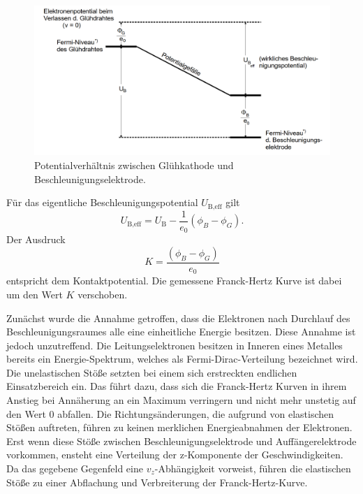 \begin{figure}[H]
	\centering
	\includegraphics[width=1.0\linewidth]{content/grafik/potential.png}
	\captionsetup{width=0.95\linewidth}
	\caption{Potentialverhältnis zwischen Glühkathode und Beschleunigungselektrode. \cite{franck}}
	\label{fig:potential}
\end{figure}

Für das eigentliche Beschleunigungspotential $U_{\text{B}, \text{eff}}$ gilt 
\begin{equation}
    U_{\text{B}, \text{eff}}=U_{\text{B}}-\frac{1}{e_0}\left(\phi_B-\phi_G\right).
    \label{eqn:potential}
\end{equation}
Der Ausdruck 
\begin{equation}
    K = \frac{\left( \phi_B - \phi_G \right)}{e_0} 
    \label{eq:Kontaktpotential} 
\end{equation}
entspricht dem Kontaktpotential. Die gemessene Franck-Hertz Kurve ist dabei um den Wert $K$ verschoben.

Zunächst wurde die Annahme getroffen, dass die Elektronen nach Durchlauf des Beschleunigungsraumes alle eine einheitliche 
Energie besitzen. Diese Annahme ist jedoch unzutreffend. Die Leitungselektronen besitzen in Inneren eines Metalles bereits 
ein Energie-Spektrum, welches als Fermi-Dirac-Verteilung bezeichnet wird.
Die unelastischen Stöße setzten bei einem sich erstreckten endlichen Einsatzbereich ein. Das führt dazu, dass
sich die Franck-Hertz Kurven in ihrem Anstieg bei Annäherung an ein Maximum verringern und nicht mehr unstetig auf den Wert 0 abfallen.
Die Richtungsänderungen, die aufgrund von elastischen Stößen auftreten, führen zu keinen merklichen Energieabnahmen der Elektronen.
Erst wenn diese Stöße zwischen Beschleunigungselektrode und Auffängerelektrode vorkommen, ensteht eine Verteilung
der z-Komponente der Geschwindigkeiten. Da das gegebene Gegenfeld eine $v_z$-Abhängigkeit vorweist, führen die elastischen
Stöße zu einer Abflachung und Verbreiterung der Franck-Hertz-Kurve.

